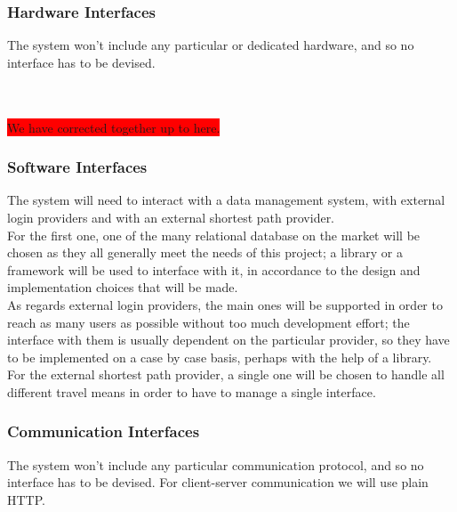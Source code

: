 \subsubsection{Hardware Interfaces}

The system won't include any particular or dedicated hardware, and so no interface has to be devised.

~\\
~\\
\colorbox{red}{We have corrected together up to here.}
~\\

\subsubsection{Software Interfaces}
The system will need to interact with a data management system, with external login providers and with an external shortest path provider.\\
For the first one, one of the many relational database on the market will be chosen as they all generally meet the needs of this project; a library or a framework will be used to interface with it, in accordance to the design and implementation choices that will be made.\\
As regards external login providers, the main ones will be supported in order to reach as many users as possible without too much development effort; the interface with them is usually dependent on the particular provider, so they have to be implemented on a case by case basis, perhaps with the help of a library.\\
For the external shortest path provider, a single one will be chosen to handle all different travel means in order to have to manage a single interface.

\subsubsection{Communication Interfaces}

The system won't include any particular communication protocol, and so no interface has to be devised. For client-server communication we will use plain HTTP.